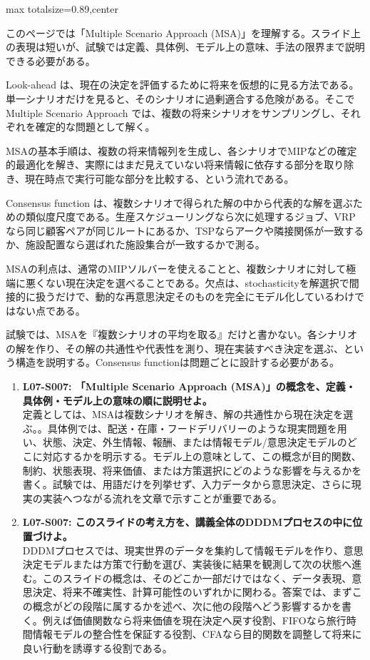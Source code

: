 \begin{minipage}[t]{0.58\textwidth}
\begin{adjustbox}{max totalsize={\textwidth}{0.89\textheight},center}
\begin{minipage}{\textwidth}\scriptsize
{}このページでは「Multiple Scenario Approach (MSA)」を理解する。スライド上の表現は短いが、試験では定義、具体例、モデル上の意味、手法の限界まで説明できる必要がある。\par
Look-ahead は、現在の決定を評価するために将来を仮想的に見る方法である。単一シナリオだけを見ると、そのシナリオに過剰適合する危険がある。そこで Multiple Scenario Approach では、複数の将来シナリオをサンプリングし、それぞれを確定的な問題として解く。\par
MSAの基本手順は、複数の将来情報列を生成し、各シナリオでMIPなどの確定的最適化を解き、実際にはまだ見えていない将来情報に依存する部分を取り除き、現在時点で実行可能な部分を比較する、という流れである。\par
Consensus function は、複数シナリオで得られた解の中から代表的な解を選ぶための類似度尺度である。生産スケジューリングなら次に処理するジョブ、VRPなら同じ顧客ペアが同じルートにあるか、TSPならアークや隣接関係が一致するか、施設配置なら選ばれた施設集合が一致するかで測る。\par
MSAの利点は、通常のMIPソルバーを使えることと、複数シナリオに対して極端に悪くない現在決定を選べることである。欠点は、stochasticityを解選択で間接的に扱うだけで、動的な再意思決定そのものを完全にモデル化しているわけではない点である。\par
試験では、MSAを『複数シナリオの平均を取る』だけと書かない。各シナリオの解を作り、その解の共通性や代表性を測り、現在実装すべき決定を選ぶ、という構造を説明する。Consensus functionは問題ごとに設計する必要がある。\par{}\begin{enumerate}\item \textbf{L07-S007: 「Multiple Scenario Approach (MSA)」の概念を、定義・具体例・モデル上の意味の順に説明せよ。}\\定義としては、MSAは複数シナリオを解き、解の共通性から現在決定を選ぶ。。具体例では、配送・在庫・フードデリバリーのような現実問題を用い、状態、決定、外生情報、報酬、または情報モデル/意思決定モデルのどこに対応するかを明示する。モデル上の意味として、この概念が目的関数、制約、状態表現、将来価値、または方策選択にどのような影響を与えるかを書く。試験では、用語だけを列挙せず、入力データから意思決定、さらに現実の実装へつながる流れを文章で示すことが重要である。\item \textbf{L07-S007: このスライドの考え方を、講義全体のDDDMプロセスの中に位置づけよ。}\\DDDMプロセスでは、現実世界のデータを集約して情報モデルを作り、意思決定モデルまたは方策で行動を選び、実装後に結果を観測して次の状態へ進む。このスライドの概念は、そのどこか一部だけではなく、データ表現、意思決定、将来不確実性、計算可能性のいずれかに関わる。答案では、まずこの概念がどの段階に属するかを述べ、次に他の段階へどう影響するかを書く。例えば価値関数なら将来価値を現在決定へ戻す役割、FIFOなら旅行時間情報モデルの整合性を保証する役割、CFAなら目的関数を調整して将来に良い行動を誘導する役割である。\end{enumerate}

\end{minipage}
\end{adjustbox}
\end{minipage}
